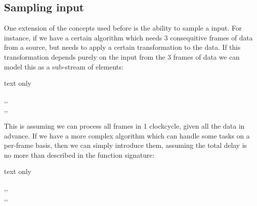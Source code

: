 \subsection{Sampling input}
One extension of the concepts used before is the ability to sample a input.
For instance, if we have a certain algorithm which needs 3 consequitive frames of data from a source, but needs to apply a certain transformation to the data.
If this transformation depends purely on the input from the 3 frames of data we can model this as a sub-stream of elements:
\begin{texexp}{text only}
\begin{hscode}\SaveRestoreHook
{}%
%
\>[B]{}\mathbin{::}\langle{},\mathbin{+},\mathbin{+}\rangle\to {}\langle{}\mathbin{+}\rangle{}\<[E]%
\\
\>[B]{}\langle{},,\rangle\mathrel{=}\;\;\;\<[E]%
\ColumnHook
\end{hscode}\resethooks
\end{texexp}
This is assuming we can process all frames in 1 clockcycle, given all the data in advance.
If we have a more complex algorithm which can handle some tasks on a per-frame basis, then we can simply introduce them, assuming the total delay is no more than described in the function signature:
\begin{texexp}{text only}
\begin{hscode}\SaveRestoreHook
{}%
%
%
%
\>[B]{}\mathbin{::}\langle{},\mathbin{+},\mathbin{+}\rangle\to {}\langle{}\mathbin{+}\rangle{}\<[E]%
\\
\>[B]{}\langle{},,\rangle\mathrel{=}\;\;\<[E]%
\\
\>[B]{}\<[5]%
\>[5]{}\;{}\<[13]%
\>[13]{}\mathrel{=}\;\<[E]%
\\
\>[13]{}\mathrel{=}\;\<[E]%
\\
\>[13]{}\mathrel{=}\;\;\<[E]%
\ColumnHook
\end{hscode}\resethooks
\end{texexp}

